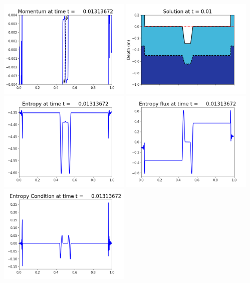 \documentclass[11pt]{article}
\begin{document}
\vskip 10pt 
\includegraphics[width=0.475\textwidth]{frame0031fig1003.png}
\includegraphics[width=0.475\textwidth]{frame0031fig1006.png}
\vskip 10pt 
\includegraphics[width=0.475\textwidth]{frame0031fig1007.png}
\includegraphics[width=0.475\textwidth]{frame0031fig1008.png}
\vskip 10pt 
\includegraphics[width=0.475\textwidth]{frame0031fig1009.png}
\end{document}
